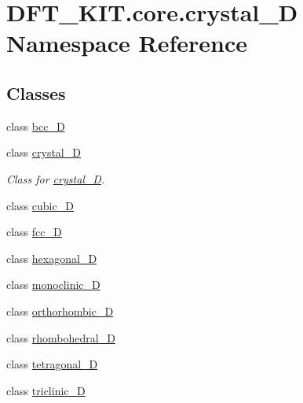 \hypertarget{namespace_d_f_t___k_i_t_1_1core_1_1crystal__3_d}{\section{D\+F\+T\+\_\+\+K\+I\+T.\+core.\+crystal\+\_\+D Namespace Reference}
\label{namespace_d_f_t___k_i_t_1_1core_1_1crystal__3_d}
}
\subsection*{Classes}
\begin{DoxyCompactItemize}
\item 
class \hyperlink{class_d_f_t___k_i_t_1_1core_1_1crystal__3_d_1_1bcc__3_d}{bcc\+\_\+D}
\item 
class \hyperlink{class_d_f_t___k_i_t_1_1core_1_1crystal__3_d_1_1crystal__3_d}{crystal\+\_\+D}
\begin{DoxyCompactList}\small\item\em Class for \hyperlink{class_d_f_t___k_i_t_1_1core_1_1crystal__3_d_1_1crystal__3_d}{crystal\+\_\+D}. \end{DoxyCompactList}\item 
class \hyperlink{class_d_f_t___k_i_t_1_1core_1_1crystal__3_d_1_1cubic__3_d}{cubic\+\_\+D}
\item 
class \hyperlink{class_d_f_t___k_i_t_1_1core_1_1crystal__3_d_1_1fcc__3_d}{fcc\+\_\+D}
\item 
class \hyperlink{class_d_f_t___k_i_t_1_1core_1_1crystal__3_d_1_1hexagonal__3_d}{hexagonal\+\_\+D}
\item 
class \hyperlink{class_d_f_t___k_i_t_1_1core_1_1crystal__3_d_1_1monoclinic__3_d}{monoclinic\+\_\+D}
\item 
class \hyperlink{class_d_f_t___k_i_t_1_1core_1_1crystal__3_d_1_1orthorhombic__3_d}{orthorhombic\+\_\+D}
\item 
class \hyperlink{class_d_f_t___k_i_t_1_1core_1_1crystal__3_d_1_1rhombohedral__3_d}{rhombohedral\+\_\+D}
\item 
class \hyperlink{class_d_f_t___k_i_t_1_1core_1_1crystal__3_d_1_1tetragonal__3_d}{tetragonal\+\_\+D}
\item 
class \hyperlink{class_d_f_t___k_i_t_1_1core_1_1crystal__3_d_1_1triclinic__3_d}{triclinic\+\_\+D}
\end{DoxyCompactItemize}
